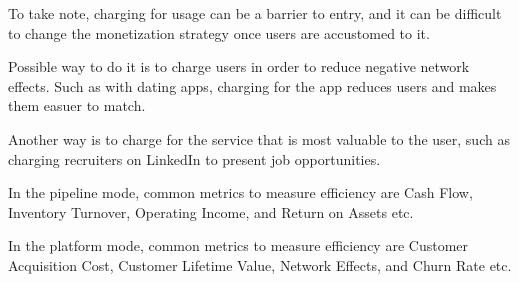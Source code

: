 To take note, charging for usage can be a barrier to entry, and it can be difficult to change the monetization strategy once users are accustomed to it.

Possible way to do it is to charge users in order to reduce negative network effects. 
Such as with dating apps, charging for the app reduces users and makes them easuer to match.

Another way is to charge for the service that is most valuable to the user, such as charging recruiters on LinkedIn to present job opportunities.

In the pipeline mode, common metrics to measure efficiency are
Cash Flow, Inventory Turnover, Operating Income, and Return on Assets etc.

In the platform mode, common metrics to measure efficiency are
Customer Acquisition Cost, Customer Lifetime Value, Network Effects, and Churn Rate etc.


